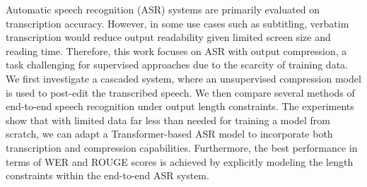 Automatic speech recognition (ASR) systems are primarily evaluated on transcription accuracy. However, in some use cases such as subtitling, verbatim transcription would reduce output readability given limited screen size and reading time. Therefore, this work focuses on ASR with output compression, a task challenging for supervised approaches due to the scarcity of training data. We first investigate a cascaded system, where an unsupervised compression model is used to post-edit the transcribed speech. We then compare several methods of end-to-end speech recognition under output length constraints. The experiments show that with limited data far less than needed for training a model from scratch, we can adapt a Transformer-based ASR model to incorporate both transcription and compression capabilities. Furthermore, the best performance in terms of WER and ROUGE scores is achieved by explicitly modeling the length constraints within the end-to-end ASR system.

